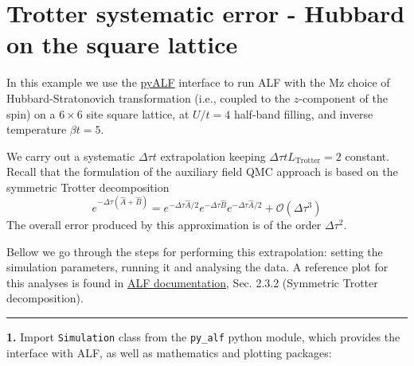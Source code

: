     
    

    
    \hypertarget{trotter-systematic-error---hubbard-on-the-square-lattice}{%
\section{Trotter systematic error - Hubbard on the square
lattice}\label{trotter-systematic-error---hubbard-on-the-square-lattice}}

    In this example we use the
\href{https://git.physik.uni-wuerzburg.de/ALF/pyALF/-/tree/ALF-2.4/}{pyALF}
interface to run ALF with the Mz choice of Hubbard-Stratonovich
transformation (i.e., coupled to the \(z\)-component of the spin) on a
\(6\times 6\) site square lattice, at \(U/t=4\) half-band filling, and
inverse temperature \(\beta t = 5\).

We carry out a systematic \(\Delta \tau t\) extrapolation keeping
\(\Delta \tau t L_\text{Trotter} = 2\) constant. Recall that the
formulation of the auxiliary field QMC approach is based on the
symmetric Trotter decomposition \[
e^{ -\Delta \tau \left( \hat{A} + \hat{B} \right) }  =  e^{ -\Delta \tau \hat{A}/2}  e^{ -\Delta \tau  \hat{B}  }   e^{ -\Delta \tau \hat{A}/2}  +  \mathcal{O} \left (\Delta  \tau^3\right)
\] The overall error produced by this approximation is of the order
\(\Delta \tau^2\).

Bellow we go through the steps for performing this extrapolation:
setting the simulation parameters, running it and analysing the data. A
reference plot for this analyses is found in
\href{https://git.physik.uni-wuerzburg.de/ALF/ALF/-/blob/master/Documentation/doc.pdf}{ALF
documentation}, Sec. 2.3.2 (Symmetric Trotter decomposition).

\begin{center}\rule{0.5\linewidth}{0.5pt}\end{center}

\textbf{1.} Import \texttt{Simulation} class from the \texttt{py\_alf}
python module, which provides the interface with ALF, as well as
mathematics and plotting packages:

